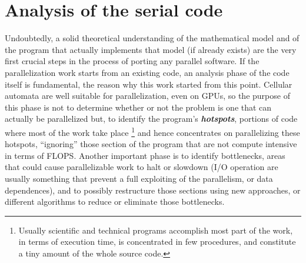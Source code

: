 \section{Analysis of the serial code}\label{analysysserialCode}
Undoubtedly, a solid theoretical understanding of the mathematical model and of
the program that actually implements that model (if already exists) are the very
first crucial steps in the process of porting any parallel software.
If the parallelization work starts from an existing code, an analysis phase of
the code itself is fundamental, the reason why this work started from this point.
Cellular automata are well suitable for parallelization, even on GPUs, so the
purpose of this phase is not to determine whether or not the problem is one that
can actually be parallelized but, to identify the program's
\textbf{\textit{hotspots}}, portions of code where most of the work take place
\footnote{Usually scientific and technical programs accomplish most part of the
work, in terms of execution time, is concentrated in few procedures, and
constitute a tiny amount of the whole source code.} and hence concentrates on
parallelizing these hotspots, ``ignoring'' those section of the program that
are not compute intensive in terms of FLOPS. Another important phase is to
identify bottlenecks, areas that could cause parallelizable work to halt or
slowdown (I/O operation are usually something that prevent a full exploiting of
the parallelism, or data dependences), and to possibly restructure those
sections using new approaches, or different algorithms to reduce or eliminate
those bottlenecks.

